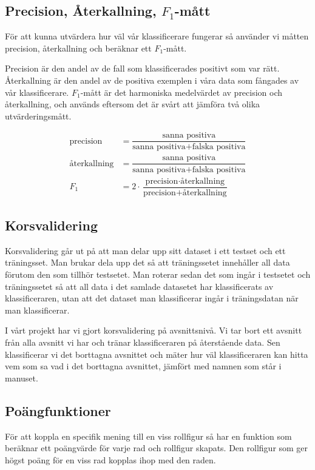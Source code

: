 \documentclass[a4paper]{article}
\begin{document}
\subsection{Precision, Återkallning, $F_1$-mått}
För att kunna utvärdera hur väl vår klassificerare fungerar så använder vi
måtten precision, återkallning och beräknar ett $F_1$-mått.

Precision är den andel av de fall som klassificerades positivt som var rätt.
Återkallning är den andel av de positiva exemplen i våra data som fångades av
vår klassificerare. $F_1$-mått är det harmoniska medelvärdet av precision och
återkallning, och används eftersom det är svårt att jämföra två olika
utvärderingsmått.

\begin{align*}
\text{precision}&=\dfrac{\text{sanna positiva}}{\text{sanna positiva} + \text{falska positiva}}\\
\text{återkallning}&=\dfrac{\text{sanna positiva}}{\text{sanna positiva} + \text{falska positiva}}\\
F_1 &= 2 \cdot \dfrac{\text{precision} \cdot \text{återkallning}}{\text{precision} + \text{återkallning}}
\end{align*}




\subsection{Korsvalidering}
Korsvalidering går ut på att man delar upp sitt dataset i ett testset och ett
träningsset. Man brukar dela upp det så att träningssetet innehåller all data
förutom den som tillhör testsetet. Man roterar sedan det som ingår i testsetet
och träningssetet så att all data i det samlade datasetet har klassificerats av
klassificeraren, utan att det dataset man klassificerar ingår i träningsdatan
när man klassificerar.

I vårt projekt har vi gjort korsvalidering på avsnittsnivå. Vi tar bort ett
avsnitt från alla avsnitt vi har och tränar klassificeraren på återstående data.
Sen klassificerar vi det borttagna avsnittet och mäter hur väl klassificeraren
kan hitta vem som sa vad i det borttagna avsnittet, jämfört med namnen som står
i manuset.

\subsection{Poängfunktioner}
För att koppla en specifik mening till en viss rollfigur så har en funktion som
beräknar ett poängvärde för varje rad och rollfigur skapats. Den rollfigur som ger
högst poäng för en viss rad kopplas ihop med den raden.
\end{document}
